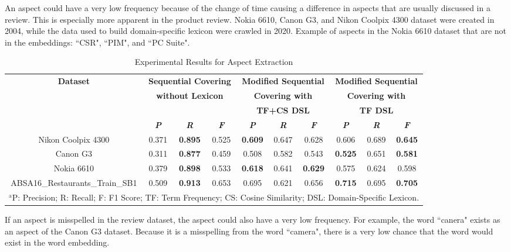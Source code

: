 \documentclass[a4paper,conference]{IEEEtran}
\begin{document}
An aspect could have a very low frequency because of the change of time causing a difference in aspects that are usually discussed in a review. This is especially more apparent in the product review. Nokia 6610, Canon G3, and Nikon Coolpix 4300 dataset were created in 2004, while the data used to build domain-specific lexicon were crawled in 2020. Example of aspects in the Nokia 6610 dataset that are not in the embeddings: ``CSR", ``PIM", and ``PC Suite".

\begin{table}[htbp]
\caption{Experimental Results for Aspect Extraction}
\begin{center}
\begin{tabular}{|c|c|c|c|c|c|c|c|c|c|}
\hline
\textbf{Dataset}&\multicolumn{3}{|c|}{\textbf{Sequential Covering}}&\multicolumn{3}{|c|}{\textbf{Modified Sequential}}&\multicolumn{3}{|c|}{\textbf{Modified Sequential}}\\
&\multicolumn{3}{|c|}{\textbf{without Lexicon}}&\multicolumn{3}{|c|}{\textbf{Covering with}}&\multicolumn{3}{|c|}{\textbf{Covering with}}\\
&\multicolumn{3}{|c|}{}&\multicolumn{3}{|c|}{\textbf{TF+CS DSL}}&\multicolumn{3}{|c|}{\textbf{TF DSL}}\\
\cline{2-10} 
&\textbf{\textit{P}}& \textbf{\textit{R}}&\textbf{\textit{F}}&\textbf{\textit{P}}& \textbf{\textit{R}}&\textbf{\textit{F}}& \textbf{\textit{P}}& \textbf{\textit{R}}&\textbf{\textit{F}}\\
\hline
Nikon Coolpix 4300&0.371&\textbf{0.895}&0.525&\textbf{0.609}&0.647&0.628&0.606&0.689&\textbf{0.645} \\
\hline
Canon G3&0.311&\textbf{0.877}&0.459&0.508&0.582&0.543&\textbf{0.525}&0.651&\textbf{0.581}\\
\hline
Nokia 6610&0.379&\textbf{0.898}&0.533&\textbf{0.618}&0.641&\textbf{0.629}&0.575&0.624&0.598 \\
\hline
ABSA16\_Restaurants\_Train\_SB1&0.509&\textbf{0.913}&0.653&0.695&0.621&0.656&\textbf{0.715}&0.695&\textbf{0.705} \\
\hline
\multicolumn{10}{l}{$^{\mathrm{a}}$P: Precision; R: Recall; F: F1 Score; TF: Term Frequency; CS: Cosine Similarity; DSL: Domain-Specific Lexicon.}\\
\end{tabular}
\label{tab8}
\end{center}
\end{table}

If an aspect is misspelled in the review dataset, the aspect could also have a very low frequency. For example, the word ``canera" exists as an aspect of the Canon G3 dataset. Because it is a misspelling from the word ``camera", there is a very low chance that the word would exist in the word embedding.
\end{document}
